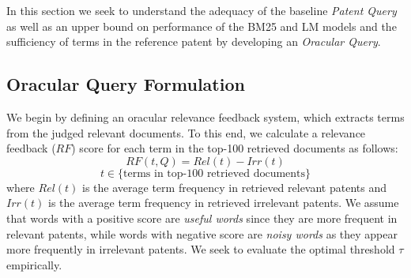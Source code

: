 %

In this section we seek to understand the adequacy of the baseline
\emph{Patent Query} as well as an upper bound on performance of the
BM25 and LM models and the sufficiency of terms in the reference patent 
by developing an \emph{Oracular Query}.

\subsection{Oracular Query Formulation}

We begin by defining an oracular relevance feedback system, which
extracts terms from the judged relevant documents.  To this end, we
calculate a relevance feedback ($\mathit{RF}$) score for each term in the top-100
retrieved documents as follows:
\begin{equation}
RF(t,Q)=Rel(t)-Irr(t) 
 \label{eq:score}
\end{equation}\vspace*{-5ex}
\begin{displaymath}t\in \lbrace \mbox{terms in top-100 retrieved documents}\rbrace\end{displaymath}
where $ \mathit{Rel(t)} $ is the average term frequency in retrieved relevant patents and $ \mathit{Irr(t)} $ is the average term frequency in retrieved irrelevant patents. We assume that words with a positive score are {\em useful words} since they are more frequent in relevant patents, while words with negative score are {\em noisy words} as they appear more frequently in irrelevant patents.  We seek to evaluate the optimal threshold $\tau$ empirically.

